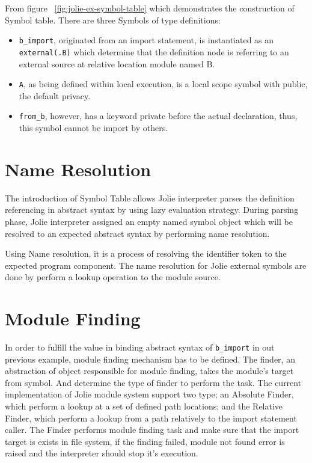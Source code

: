 From figure ~\ref{fig:jolie-ex-symbol-table} which demonstrates the construction of Symbol table. There are three Symbols of type definitions: 
\begin{itemize}
    \item \texttt{b_import}, originated from an import statement, is instantiated as an \texttt{external(.B)} which determine that the definition node is referring to an external source at relative location module named B. 
    \item \texttt{A}, as being defined within local execution, is a local scope symbol with public, the default privacy.
    \item \texttt{from_b}, however, has a keyword private before the actual declaration, thus, this symbol cannot be import by others.
\end{itemize}

\section{ Name Resolution }

The introduction of Symbol Table allows Jolie interpreter parses the definition referencing in abstract syntax by using lazy evaluation strategy.
During parsing phase, Jolie interpreter assigned an empty named symbol object which will be resolved to an expected abstract syntax by performing name resolution.

Using Name resolution, it is a process of resolving the identifier token to the expected program component. 
The name resolution for Jolie external symbols are done by perform a lookup operation to the module source. 


\section{ Module Finding }

In order to fulfill the value in binding abstract syntax of \texttt{b_import} in out previous example, module finding mechanism has to be defined. The finder, an abstraction of object responsible for module finding, takes the module's target from symbol. And determine the type of finder to perform the task. The current implementation of Jolie module system support two type; an Absolute Finder, which perform a lookup at a set of defined path locations; and the Relative Finder, which perform a lookup from a path relatively to the import statement caller. The Finder performs module finding task and make sure that the import target is exists in file system, if the finding failed, module not found error is raised and the interpreter should stop it's execution.

